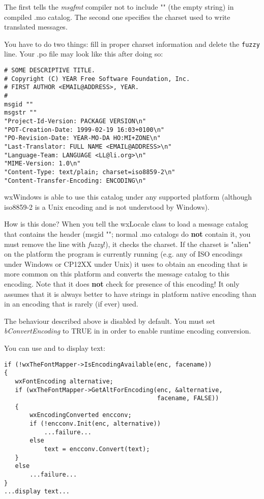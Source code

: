 The first tells the {\it msgfmt} compiler not to include "" (the empty string)
in compiled .mo catalog. The second one specifies the charset used to write
translated messages.

You have to do two things: fill in proper charset information and delete
the {\tt fuzzy} line. Your .po file may look like this after doing so:

\begin{verbatim}
# SOME DESCRIPTIVE TITLE.
# Copyright (C) YEAR Free Software Foundation, Inc.
# FIRST AUTHOR <EMAIL@ADDRESS>, YEAR.
#
msgid ""
msgstr ""
"Project-Id-Version: PACKAGE VERSION\n"
"POT-Creation-Date: 1999-02-19 16:03+0100\n"
"PO-Revision-Date: YEAR-MO-DA HO:MI+ZONE\n"
"Last-Translator: FULL NAME <EMAIL@ADDRESS>\n"
"Language-Team: LANGUAGE <LL@li.org>\n"
"MIME-Version: 1.0\n"
"Content-Type: text/plain; charset=iso8859-2\n"
"Content-Transfer-Encoding: ENCODING\n"
\end{verbatim}

wxWindows is able to use this catalog under any supported platform
(although iso8859-2 is a Unix encoding and is not understood by Windows).

How is this done? When you tell the wxLocale class to load a message catalog that
contains the header (msgid ""; normal .mo catalogs do {\bf not} contain it,
you must remove the line with {\it fuzzy}!), it checks the charset. If the
charset is "alien" on the platform the program is currently running (e.g.
any of ISO encodings under Windows or CP12XX under Unix) it uses 
to obtain an encoding that is more common on this platform and converts
the message catalog to this encoding. Note that it does {\bf not} check
for presence of this encoding! It only assumes that it is always better to
have strings in platform native encoding than in an encoding that is rarely
(if ever) used.

The behaviour described above is disabled by default.
You must set {\it bConvertEncoding} to TRUE in 
 in order to enable
runtime encoding conversion.


You can use  and 
 to display text:

\begin{verbatim}
if (!wxTheFontMapper->IsEncodingAvailable(enc, facename))
{
   wxFontEncoding alternative;
   if (wxTheFontMapper->GetAltForEncoding(enc, &alternative, 
                                          facename, FALSE))
   {
       wxEncodingConverted encconv;
       if (!encconv.Init(enc, alternative))
           ...failure...
       else
           text = encconv.Convert(text);
   }
   else
       ...failure...
}
...display text...
\end{verbatim}

